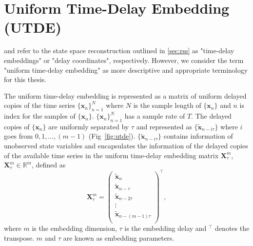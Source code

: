 \section{Uniform Time-Delay Embedding (UTDE)}\label{sec:utimedelayembedding}
\cite{frank2010} and \cite{sama2013} refer to the state space reconstruction 
outlined in \ref{sec:rss} as "time-delay embeddings" or "delay coordinates", 
respectively. However, we consider the term "uniform time-delay embedding"
as more descriptive and appropriate terminology for this thesis.

The uniform time-delay embedding is represented as a matrix of uniform 
delayed copies of the time series $\{ \boldsymbol{x}_n \}_{n=1}^N$ where $N$ 
is the sample length of $\{ \boldsymbol{x}_n \}$ and $n$ is index for the 
samples of $\{ \boldsymbol{x}_n \}$. $\{ \boldsymbol{x}_n \}_{n=1}^N$ has a 
sample rate of $T$. The delayed copies of $\{ \boldsymbol{x}_n \}$ are 
uniformly separated by $\tau$ and represented as 
$\{\boldsymbol{ \tilde{x} }_{n- i\tau} \}$ where $i$ goes from 
$0,1, \dots, (m-1)$ (Fig~\ref{fig:utde}).
$\{\boldsymbol{ \tilde{x} }_{n- i\tau} \}$ contains information of unobserved 
state variables and encapsulates the information of the delayed copies of 
the available time series in the uniform time-delay embedding matrix 
$\boldsymbol{X}^{m}_{\tau}$, $\boldsymbol{X}^{m}_{\tau} \in \mathbb{R}^m$, 
defined as
\begin{equation}\label{eq:tde}
\boldsymbol{X}^{m}_{\tau}  =
\begin{pmatrix}
\boldsymbol{ \tilde{x} }_n \\
\boldsymbol{ \tilde{x} }_{n-\tau} \\
\boldsymbol{ \tilde{x} }_{n-2\tau} \\
\vdots \\
\boldsymbol{ \tilde{x} }_{n- (m-1) \tau} \\
\end{pmatrix}^\intercal, 
\end{equation}
where $m$ is the embedding dimension, $\tau$ is the embedding delay and
$ ^\intercal$ denotes the transpose. $m$ and $\tau$ are known as embedding 
parameters.
